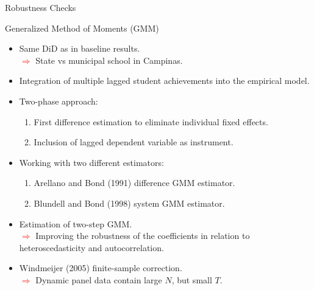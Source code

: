\documentclass{beamer}
\begin{document}
\begin{frame}[label=Main4]{Robustness Checks}
\begin{block}{\centering \Large Generalized Method of Moments (GMM)}
\vspace{-19pt} \flushright \hyperlink{GMM}{\beamerbutton{\textcolor{red}{Formal}}}
\begin{itemize}
\item [\sbt] \scriptsize Same DiD as in baseline results. \\ \tiny \textcolor{red}{$\Longrightarrow$} State vs municipal school in Campinas.
\item [\sbt] \scriptsize Integration of multiple lagged student achievements into the empirical model.
\item [\sbt] \scriptsize Two-phase approach:
\begin{enumerate}
\item \scriptsize First difference estimation to eliminate individual fixed effects.
\item \scriptsize Inclusion of lagged dependent variable as instrument.
\end{enumerate}
\item [\sbt] \scriptsize Working with two different estimators:
\begin{enumerate}
\item \scriptsize Arellano and Bond (1991) difference GMM estimator.
\item \scriptsize Blundell and Bond (1998) system GMM estimator.
\end{enumerate}
\item [\sbt] \scriptsize Estimation of two-step GMM. \\ \tiny \textcolor{red}{$\Longrightarrow$} Improving the robustness of the coefficients in relation to heteroscedasticity and autocorrelation.
\item [\sbt] \scriptsize Windmeijer (2005) finite-sample correction.
\\ \tiny \textcolor{red}{$\Longrightarrow$} Dynamic panel data contain large $N$, but small $T$.
\end{itemize}
\end{block}
\end{frame}
\end{document}
